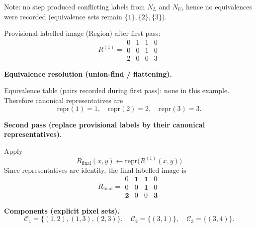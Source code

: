{  \vspace{6pt}
  Note: no step produced conflicting labels from \(N_L\) and \(N_U\), hence no equivalences were recorded (equivalence sets remain \(\{1\},\{2\},\{3\}\)).

Provisional labelled image (Region) after first pass:
\[
R^{(1)}=
\begin{matrix}
0 & 1 & 1 & 0\\
0 & 0 & 1 & 0\\
2 & 0 & 0 & 3
\end{matrix}
\]

\textbf{Equivalence resolution (union-find / flattening).}

Equivalence table (pairs recorded during first pass): none in this example. Therefore canonical representatives are
\[
\mathrm{repr}(1)=1,\quad \mathrm{repr}(2)=2,\quad \mathrm{repr}(3)=3.
\]

\textbf{Second pass (replace provisional labels by their canonical representatives).}

Apply \[R_{\text{final}}(x,y)\leftarrow\mathrm{repr}\big(R^{(1)}(x,y)\big)\]
Since representatives are identity, the final labelled image is
\[
R_{\text{final}}=
\begin{matrix}
0 & \mathbf{1} & \mathbf{1} & 0\\
0 & 0 & \mathbf{1} & 0\\
\mathbf{2} & 0 & 0 & \mathbf{3}
\end{matrix}
\]

\textbf{Components (explicit pixel sets).}
\[
\mathcal{C}_1=\{(1,2),(1,3),(2,3)\},\quad
\mathcal{C}_2=\{(3,1)\},\quad
\mathcal{C}_3=\{(3,4)\}.
\]

}

